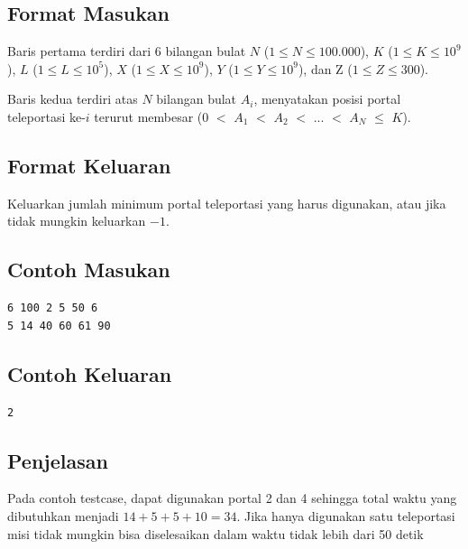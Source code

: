 \documentclass{article}
\begin{document}
\subsection*{Format Masukan}
Baris pertama terdiri dari 6 bilangan bulat $N$ ($1 \leq N \leq 100.000$), $K$ ($1 \leq K \leq 10^9$), $L$ ($1 \leq L \leq 10^5$), $X$ ($1 \leq X \leq 10^9$), $Y$ ($1 \leq Y \leq 10^9$), dan Z ($1 \leq Z \leq 300$).

Baris kedua terdiri atas $N$ bilangan bulat $A_i$, menyatakan posisi portal teleportasi ke-$i$ terurut membesar ($0$ $<$ $A_1$ $<$ $A_2$ $<$ ... $<$ $A_N$ $\leq$ $K$).

\subsection*{Format Keluaran}
Keluarkan jumlah minimum portal teleportasi yang harus digunakan, atau jika tidak mungkin keluarkan $-1$.

\begin{multicols}{2}
\subsection*{Contoh Masukan}
\begin{lstlisting}
6 100 2 5 50 6
5 14 40 60 61 90
\end{lstlisting}
\columnbreak

\subsection*{Contoh Keluaran}
\begin{lstlisting}
2
\end{lstlisting}
\vfill
\null
\end{multicols}

 \subsection*{Penjelasan}
Pada contoh testcase, dapat digunakan portal 2 dan 4 sehingga total waktu yang dibutuhkan menjadi $14+5+5+10=34$. Jika hanya digunakan satu teleportasi misi tidak mungkin bisa diselesaikan dalam waktu tidak lebih dari 50 detik
\end{document}
